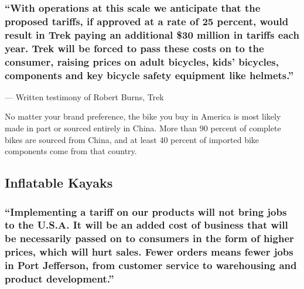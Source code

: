 \hypertarget{with-operations-at-this-scale-we-anticipate-that-the-proposed-tariffs-if-approved-at-a-rate-of-25-percent-would-result-in-trek-paying-an-additional-30-million-in-tariffs-each-year-trek-will-be-forced-to-pass-these-costs-on-to-the-consumer-raising-prices-on-adult-bicycles-kids-bicycles-components-and-key-bicycle-safety-equipment-like-helmets}{%
\subsubsection{``With operations at this scale we anticipate that the
proposed tariffs, if approved at a rate of 25 percent, would result in
Trek paying an additional \$30 million in tariffs each year. Trek will
be forced to pass these costs on to the consumer, raising prices on
adult bicycles, kids' bicycles, components and key bicycle safety
equipment like
helmets.''}\label{with-operations-at-this-scale-we-anticipate-that-the-proposed-tariffs-if-approved-at-a-rate-of-25-percent-would-result-in-trek-paying-an-additional-30-million-in-tariffs-each-year-trek-will-be-forced-to-pass-these-costs-on-to-the-consumer-raising-prices-on-adult-bicycles-kids-bicycles-components-and-key-bicycle-safety-equipment-like-helmets}}

--- Written testimony of Robert Burns, Trek

No matter your brand preference, the bike you buy in America is most
likely made in part or sourced entirely in China. More than 90 percent
of complete bikes are sourced from China, and at least 40 percent of
imported bike components come from that country.

\hypertarget{inflatable-kayaks}{%
\subsection{Inflatable Kayaks}\label{inflatable-kayaks}}

\hypertarget{implementing-a-tariff-on-our-products-will-not-bring-jobs-to-the-usa-it-will-be-an-added-cost-of-business-that-will-be-necessarily-passed-on-to-consumers-in-the-form-of-higher-prices-which-will-hurt-sales-fewer-orders-means-fewer-jobs-in-port-jefferson-from-customer-service-to-warehousing-and-product-development}{%
\subsubsection{``Implementing a tariff on our products will not bring
jobs to the U.S.A. It will be an added cost of business that will be
necessarily passed on to consumers in the form of higher prices, which
will hurt sales. Fewer orders means fewer jobs in Port Jefferson, from
customer service to warehousing and product
development.''}\label{implementing-a-tariff-on-our-products-will-not-bring-jobs-to-the-usa-it-will-be-an-added-cost-of-business-that-will-be-necessarily-passed-on-to-consumers-in-the-form-of-higher-prices-which-will-hurt-sales-fewer-orders-means-fewer-jobs-in-port-jefferson-from-customer-service-to-warehousing-and-product-development}}

